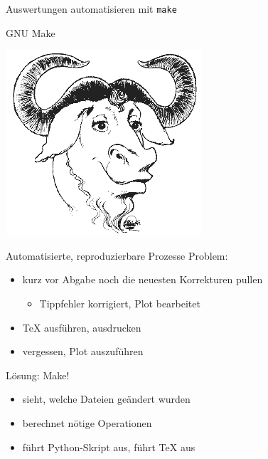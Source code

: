 
\begin{frame}
  \centering
  \Huge Auswertungen automatisieren mit \texttt{make}
\end{frame}

\begin{frame}{GNU Make}
  \begin{center}
    \includegraphics[scale=0.5]{logos/gnu.png}
  \end{center}
\end{frame}

\begin{frame}{Automatisierte, reproduzierbare Prozesse}
  Problem:
  \begin{itemize}
    \item kurz vor Abgabe noch die neuesten Korrekturen pullen
      \begin{itemize}
        \item Tippfehler korrigiert, Plot bearbeitet
      \end{itemize}
    \item \TeX{} ausführen, ausdrucken
    \item vergessen, Plot auszuführen
  \end{itemize}
  Lösung: Make!
  \begin{itemize}
    \item sieht, welche Dateien geändert wurden
    \item berechnet nötige Operationen
    \item führt Python-Skript aus, führt \TeX{} aus
  \end{itemize}
\end{frame}

